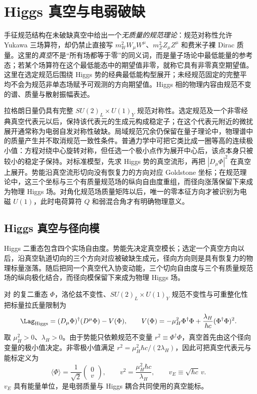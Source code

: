 \section{Higgs 真空与电弱破缺}\label{sec:sm-higgs-ewsb-dp11}

手征规范结构在未破缺真空中给出一个\emph{无质量的规范理论}：规范对称性允许 Yukawa 三场算符，却仍禁止直接写 $m_W^2W_\mu W^\mu$、$m_Z^2Z_\mu Z^\mu$ 和费米子裸 Dirac 质量。这里的\emph{真空}不是“所有场都等于零”的同义词，而是量子场论中最低能量的参考态；若某个场算符在这个最低能态中的期望值非零，就称它具有非零真空期望值。这里在选定规范后围绕 Higgs 势的经典最低能构型展开；未经规范固定的完整平均不会为规范非单态场赋予可观测的方向期望值。Higgs 相的物理内容由规范不变的谱、质量与散射振幅表述。

拉格朗日量仍具有完整 $SU(2)_L\times U(1)_Y$ 规范对称性。选定规范及一个非零经典真空代表元以后，保持该代表元的生成元构成稳定子；在这个代表元附近的微扰展开通常称为电弱自发对称性破缺。局域规范冗余仍保留在量子理论中，物理谱中的质量产生并不取消规范一致性条件。普通力学中可把它类比成一圈等高的连续极小值：方程对绕中心旋转对称，但任选一个极小点作为展开中心后，该点本身只被较小的稳定子保持。对标准模型，先求 Higgs 势的真空流形，再把 $|D_\mu\Phi|^2$ 在真空上展开。势能沿真空流形切向没有恢复力的方向对应 Goldstone 坐标；在规范理论中，这三个坐标与三个有质量规范场的纵向自由度重组，而径向涨落保留下来成为物理 Higgs 场。对角化规范场质量矩阵以后，唯一的零本征方向才被识别为电磁 $U(1)$，此时电荷算符 $Q$ 和弱混合角才有明确物理意义。

\subsection{Higgs 真空与径向模}

Higgs 二重态包含四个实场自由度。势能先决定真空模长；选定一个真空方向以后，沿真空轨道切向的三个方向对应被破缺生成元，径向方向则是具有恢复力的物理标量涨落。随后把同一个真空代入协变动能，三个切向自由度与三个有质量规范场的纵向极化结合，而径向模保留下来成为物理 Higgs 场。

\begin{definition}
对  的复二重态 $\Phi$，洛伦兹不变性、$SU(2)_L\times U(1)_Y$ 规范不变性与可重整化性把标量拉氏量限制为
\begin{equation}
 {
 \Lag_{\rm Higgs}
 =(D_\mu\Phi)^\dagger(D^\mu\Phi)
 -V(\Phi),
 \qquad
 V(\Phi)=-\mu_H^2\Phi^\dagger\Phi
 +\frac{\lambda_H}{\hbar c}(\Phi^\dagger\Phi)^2.}
 \label{eq:sm-higgs-lagrangian-dp11}
\end{equation}
取 $\mu_H^2>0$、$\lambda_H>0$。由于势能只依赖规范不变量 $r^2\equiv\Phi^\dagger\Phi$，真空首先由这个径向变量的极小值决定。非零极小值满足 $r^2=\mu_H^2\hbar c/(2\lambda_H)$，因此可把真空代表元与能标定义为
\begin{equation}
 {
 \langle\Phi\rangle
 =\frac1{\sqrt2}\begin{pmatrix}0\\v\end{pmatrix},
 \qquad
 v^2=\frac{\mu_H^2\hbar c}{\lambda_H},
 \qquad
 v_E\equiv\sqrt{\hbar c}\,v.}
 \label{eq:sm-higgs-vev-dp11}
\end{equation}
$v_E$ 具有能量单位，是电弱质量与 Higgs 耦合共同使用的真空能标。
\end{definition}

